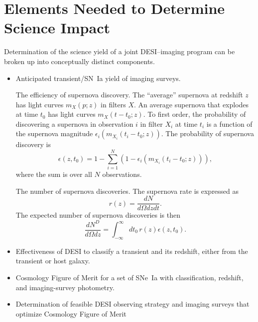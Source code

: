 \documentclass[onecolumn]{aastex61}   	%
\begin{document}
\section{Elements Needed to Determine Science Impact}
Determination of the science yield of a  joint DESI--imaging program can be broken up into conceptually distinct components.
\begin{itemize}
\item Anticipated transient/SN~Ia yield of imaging surveys.

The efficiency of supernova discovery.  The ``average''  supernova at redshift $z$ has light curves $m_X(p;z)$ in filters $X$.  An average supernova
 that explodes at time $t_0$ has  light curves
$m_X(t-t_0; z)$. To first order, the probability of discovering a supernova
in observation $i$ in filter $X_i$ at time $t_i$ is a function of the supernova magnitude  $\epsilon_i(m_{X_i}(t_i-t_0;z))$.  The probability of supernova
discovery is
\begin{equation}
\epsilon(z, t_0) = 1- \sum_{i=1}^{N} \left(1-\epsilon_i(m_{X_i}(t_i-t_0;z))\right),
\end{equation}
where the sum is over all $N$ observations.

The number of supernova discoveries.
The supernova rate is expressed as
\begin{equation}
r(z) = \frac{dN}{d\Omega dz dt}.
\end{equation}
The expected number of supernova discoveries is then
\begin{equation}
 \frac{dN^{D}}{d\Omega dz} = \int_{-\infty}^{\infty} dt_0\, r(z) \epsilon(z, t_0).
\end{equation}




\item Effectiveness of DESI to classify a transient and its redshift, either from the transient or host galaxy.
\item Cosmology Figure of Merit for a set of SNe~Ia with classification, redshift, and imaging-survey photometry.
\item Determination of feasible DESI observing strategy and imaging surveys that optimize Cosmology Figure of Merit 
\end{itemize}
\end{document}
